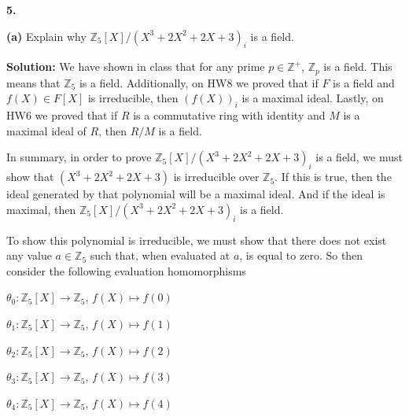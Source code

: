 \documentclass[12pt, a4paper]{article}
\begin{document}
\vspace{6mm}

\noindent\textbf{5.}

\vspace{2mm}\par

\textbf{(a)} Explain why $\mathbb{Z}_5[X]/(X^3+2X^2+2X+3)_i$ is a field.

\vspace{4mm}

\noindent\textbf{Solution:} We have shown in class that for any prime $p\in\mathbb{Z}^{+}$, $\mathbb{Z}_p$ is a field. This means that $\mathbb{Z}_5$ is a field. Additionally, on HW8 we proved that if $F$ is a field and $f(X)\in F[X]$ is irreducible, then $(f(X))_i$ is a maximal ideal. Lastly, on HW6 we proved that if $R$ is a commutative ring with identity and $M$ is a maximal ideal of $R$, then $R/M$ is a field.\par
In summary, in order to prove $\mathbb{Z}_5[X]/(X^3+2X^2+2X+3)_i$ is a field, we must show that $(X^3+2X^2+2X+3)$ is irreducible over $\mathbb{Z}_5$. If this is true, then the ideal generated by that polynomial will be a maximal ideal. And if the ideal is maximal, then $\mathbb{Z}_5[X]/(X^3+2X^2+2X+3)_i$ is a field.\par
To show this polynomial is irreducible, we must show that there does not exist any value $a\in\mathbb{Z}_5$ such that, when evaluated at $a$, is equal to zero. So then consider the following evaluation homomorphisms

\newpage

\centerline{$\theta_0\colon\mathbb{Z}_5[X]\rightarrow\mathbb{Z}_5$,  $f(X)\mapsto f(0)$}

\vspace{2mm}

\centerline{$\theta_1\colon\mathbb{Z}_5[X]\rightarrow\mathbb{Z}_5$,  $f(X)\mapsto f(1)$}

\vspace{2mm}

\centerline{$\theta_2\colon\mathbb{Z}_5[X]\rightarrow\mathbb{Z}_5$,  $f(X)\mapsto f(2)$}

\vspace{2mm}

\centerline{$\theta_3\colon\mathbb{Z}_5[X]\rightarrow\mathbb{Z}_5$,  $f(X)\mapsto f(3)$}

\vspace{2mm}

\centerline{$\theta_4\colon\mathbb{Z}_5[X]\rightarrow\mathbb{Z}_5$,  $f(X)\mapsto f(4)$}
\end{document}
